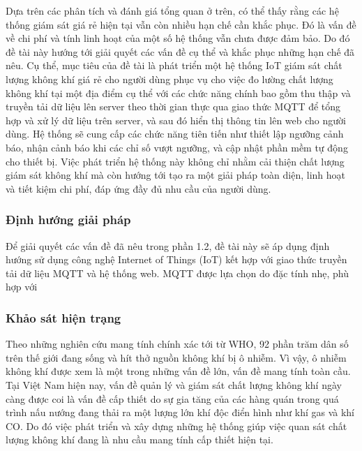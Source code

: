 \documentclass[12pt,a4paper]{article}
\begin{document}
Dựa trên các phân tích và đánh giá tổng quan ở trên, có thể thấy rằng các hệ thống giám sát giá rẻ hiện tại vẫn còn nhiều hạn chế cần khắc phục. Đó là vấn đề về chi phí và tính linh hoạt của một số hệ thống vẫn chưa được đảm bảo. Do đó đề tài này hướng tới giải quyết các vấn đề cụ thể và khắc phục những hạn chế đã nêu. Cụ thể, mục tiêu của đề tài là phát triển một hệ thống IoT giám sát chất lượng không khí giá rẻ cho người dùng phục vụ cho việc đo lường chất lượng không khí tại một địa điểm cụ thể với các chức năng chính bao gồm thu thập và truyền tải dữ liệu lên server theo thời gian thực qua giao thức MQTT để tổng hợp và xử lý dữ liệu trên server, và sau đó hiển thị thông tin lên web cho người dùng. Hệ thống sẽ cung cấp các chức năng tiên tiến như thiết lập ngưỡng cảnh báo, nhận cảnh báo khi các chỉ số vượt ngưỡng, và cập nhật phần mềm tự động cho thiết bị. Việc phát triển hệ thống này không chỉ nhằm cải thiện chất lượng giám sát không khí mà còn hướng tới tạo ra một giải pháp toàn diện, linh hoạt và tiết kiệm chi phí, đáp ứng đầy đủ nhu cầu của người dùng.

\subsubsection{Định hướng giải pháp}
Để giải quyết các vấn đề đã nêu trong phần 1.2, đề tài này sẽ áp dụng định hướng sử dụng công nghệ Internet of Things (IoT) kết hợp với giao thức truyền tải dữ liệu MQTT và hệ thống web. MQTT được lựa chọn do đặc tính nhẹ, phù hợp với

\subsubsection{Khảo sát hiện trạng}
Theo những nghiên cứu mang tính chính xác tới từ WHO, 92 phần trăm dân số trên thế giới đang sống và hít thở nguồn không khí bị ô nhiễm. Vì vậy, ô nhiễm không khí được xem là một trong những vấn đề lớn, vấn đề mang tính toàn cầu. Tại Việt Nam hiện nay, vấn đề quản lý và giám sát chất lượng không khí ngày càng được coi là vấn đề cấp thiết do sự gia tăng của các hàng quán trong quá trình nấu nướng đang thải ra một lượng lớn khí độc điển hình như khí gas và khí CO. Do đó việc phát triển và xây dựng những hệ thống giúp việc quan sát chất lượng không khí đang là nhu cầu mang tính cấp thiết hiện tại.
\end{document}

